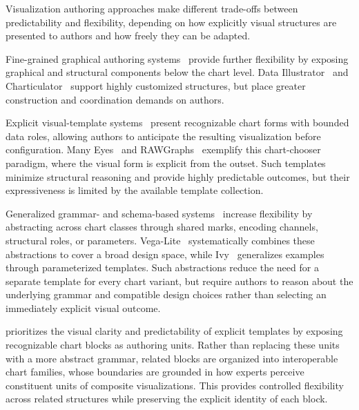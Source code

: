 Visualization authoring approaches make different trade-offs between
predictability and flexibility, depending on how explicitly visual structures
are presented to authors and how freely they can be adapted.

Fine-grained graphical authoring systems~\cite{D3,Protovis,Lyra,Lyra2,
DataIllustrator,Charticulator,iVisDesigner,DataDrivenGuides,StructGraphics,
Hanpuku,iVoLVER,DataInk,DataBreeze,InChorus,Liger,
VisualizationbyDemonstration,CreatingChartsbyDemonstrationGold} provide
further flexibility by exposing graphical and structural components below the
chart level. Data Illustrator~\cite{DataIllustrator} and
Charticulator~\cite{Charticulator} support highly customized structures, but
place greater construction and coordination demands on authors.


Explicit visual-template systems~\cite{ManyEyes,RAWGraphs} present
recognizable chart forms with bounded data roles, allowing authors to
anticipate the resulting visualization before configuration.
Many Eyes~\cite{ManyEyes} and RAWGraphs~\cite{RAWGraphs} exemplify this
chart-chooser paradigm, where the visual form is explicit from the outset.
Such templates minimize structural reasoning and provide highly predictable
outcomes, but their expressiveness is limited by the available template
collection.

Generalized grammar- and schema-based systems~\cite{Tableau, Vega,VegaLite,
ggplot2LayeredGrammarofGraphics,Polaris,Tableau,ApacheECharts,Altair,Ivy}
increase flexibility by abstracting across chart classes through shared marks,
encoding channels, structural roles, or parameters. Vega-Lite~\cite{VegaLite}
systematically combines these abstractions to cover a broad design space,
while Ivy~\cite{Ivy} generalizes examples through parameterized templates.
Such abstractions reduce the need for a separate template for every chart
variant, but require authors to reason about the underlying grammar and
compatible design choices rather than selecting an immediately explicit
visual outcome.



{\system} prioritizes the visual clarity and predictability of explicit
templates by exposing recognizable chart blocks as authoring units. Rather
than replacing these units with a more abstract grammar, related blocks are
organized into interoperable chart families, whose boundaries are grounded in
how experts perceive constituent units of composite visualizations. This
provides controlled flexibility across related structures while preserving
the explicit identity of each block.

